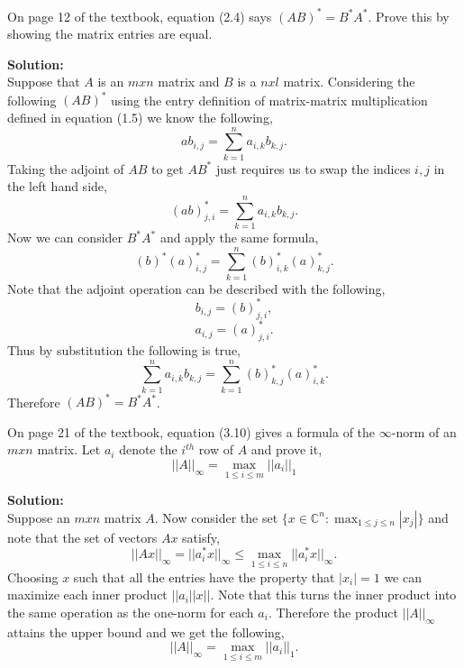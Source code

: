 \documentclass[12pt]{article}
\makeatletter
\theoremstyle{homework}
\newenvironment{exercise}[1]
{\def\@currentlabel{#1}\exercisecore}
{\endexercisecore}
\newcommand{\localhead}[1]{\par\smallskip\noindent\textbf{#1}\nobreak\\}%
\newcommand\solution{\localhead{Solution:}}
\newcommand{\Cplx}{\ensuremath{\mathbb C}}
\let\CC\Cplx
\makeatother
\begin{document}
\begin{exercise}{P8} On page 12 of the textbook, equation (2.4) says $(AB)^* = B^*A^*$.
  Prove this by showing the matrix entries are equal.\\
  \solution Suppose that $A$ is an $mxn$ matrix and $B$ is a $nxl$ matrix. Considering the following $(AB)^*$ using the entry definition of matrix-matrix multiplication
  defined in equation (1.5) we know the following, 
  \begin{equation*}
    ab_{i,j} = \sum_{k = 1}^n a_{i,k}b_{k,j}.
  \end{equation*}
  Taking the adjoint of $AB$ to get $AB^*$ just requires us to swap the indices $i,j$ in the left hand side, 
  \begin{equation*}
    (ab)^*_{j,i} = \sum_{k = 1}^n a_{i,k}b_{k,j}.
  \end{equation*}
  Now we can consider $B^*A^*$ and apply the same formula,
  \begin{equation*}
    (b)^*(a)^*_{i,j} = \sum_{k = 1}^n (b)^*_{i,k}(a)^*_{k,j}.
  \end{equation*}
  Note that the adjoint operation can be described with the following, 
  \begin{equation*}
    b_{i,j} = (b)^*_{j,i},
  \end{equation*}
  \begin{equation*}
    a_{i,j} = (a)^*_{j,i}.
  \end{equation*}
  Thus by substitution the following is true,
  \begin{equation*}
    \sum_{k = 1}^n a_{i,k}b_{k,j} = \sum_{k = 1}^n (b)^*_{k,j}(a)^*_{i,k}.
  \end{equation*}
  Therefore  $(AB)^* = B^*A^*$. 
\end{exercise}
\vspace{.25in}






\begin{exercise}{P9} On page 21 of the textbook, equation (3.10) gives a formula of 
  the $\infty$-norm of an $mxn$ matrix. Let $a_i$ denote the $i^{th}$ row of $A$ and prove it,
  \begin{equation*}
    ||A||_{\infty} = \max_{1 \leq i \leq m}||a_i||_1
  \end{equation*}
  \solution Suppose an $mxn$ matrix $A$. Now consider the
  set $\{x \in \CC^{n}: \max_{1 \leq j \leq n} |x_j|\}$ and note that the set of vectors $Ax$ satisfy,
  \begin{equation*}    
      ||Ax||_{\infty} = ||a^*_ix||_{\infty} \leq \max_{1 \leq i \leq n}||a^*_ix||_{\infty}.
  \end{equation*}
  Choosing $x$ such that all the entries have the property that $|x_i| = 1$ we can maximize each inner product $||a_i||x||$.
  Note that this turns the inner product into the same operation as the one-norm for each $a_i$. Therefore the product 
  $||A||_{\infty}$ attains the upper bound and we get the following,
  \begin{equation*}
  ||A||_{\infty} = \max_{1 \leq i \leq m}||a_i||_1.
  \end{equation*}
\end{exercise}
\vspace{.25in}
\end{document}
